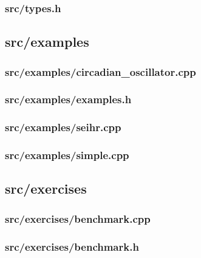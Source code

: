 \subsubsection{src/types.h}


\newpage
\subsection{src/examples}
\subsubsection{src/examples/circadian\_oscillator.cpp}\label{subsection:circadian_oscillator}

\newpage
\subsubsection{src/examples/examples.h}

\newpage
\subsubsection{src/examples/seihr.cpp}\label{subsection:seihr}

\newpage
\subsubsection{src/examples/simple.cpp}\label{subsection:simple}


\newpage
\subsection{src/exercises}
\subsubsection{src/exercises/benchmark.cpp}\label{subsection:benchmark}

\newpage
\subsubsection{src/exercises/benchmark.h}

\newpage

